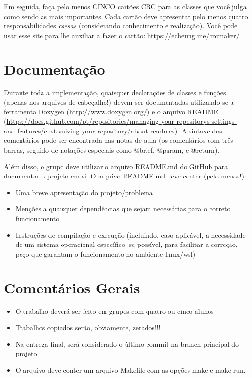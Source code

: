 \documentclass[11pt]{article}
\begin{document}
Em seguida, faça pelo menos CINCO cartões CRC para as classes que você
julga como sendo as mais importantes. Cada cartão deve apresentar pelo
menos quatro responsabilidades \emph{coesas} (considerando conhecimento e
realização). Você pode usar esse site para lhe auxiliar a fazer o
cartão: \url{https://echeung.me/crcmaker/}
\section{Documentação}
\label{sec:org5d5468c}

Durante toda a implementação, quaisquer declarações de
classes e funções (apenas nos arquivos de cabeçalho!) devem ser
documentadas utilizando-se a ferramenta Doxygen
(\url{http://www.doxygen.org/}) e o arquivo README
(\url{https://docs.github.com/pt/repositories/managing-your-repositorys-settings-and-features/customizing-your-repository/about-readmes}).
A sintaxe dos comentários pode ser encontrada nas notas de aula (os
comentários com três barras, seguido de notações especiais como
@brief, @param, e @return).

Além disso, o grupo deve utilizar o arquivo README.md do GitHub para
documentar o projeto em si. O arquivo README.md deve conter (pelo
menos!):

\begin{itemize}
\item Uma breve apresentação do projeto/problema
\item Menções a quaisquer dependências que sejam necessárias para
o correto funcionamento
\item Instruções de compilação e execução (incluindo, caso aplicável, a
necessidade de um sistema operacional específico; se possível, para
facilitar a correção, peço que garantam o funcionamento no ambiente
linux/wsl)
\end{itemize}
\section{Comentários Gerais}
\label{sec:orgc705345}

\begin{itemize}
\item O trabalho deverá ser feito em grupos com quatro ou cinco alunos
\item Trabalhos copiados serão, obviamente, zerados!!!
\item Na entrega final, será considerado o último commit na branch principal do projeto
\item O arquivo deve conter um arquivo Makefile com as opções make e make run.
\end{itemize}
\end{document}
